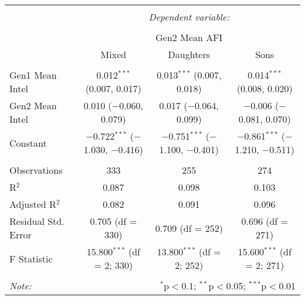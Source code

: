 
\begingroup 
\small 
\begin{tabular}{@{\extracolsep{1pt}}lccc} 
\\[-1.8ex]\hline 
\hline \\[-1.8ex] 
 & \multicolumn{3}{c}{\textit{Dependent variable:}} \\ 
\cline{2-4} 
\\[-1.8ex] & \multicolumn{3}{c}{Gen2 Mean AFI} \\ 
 & Mixed & Daughters & Sons \\ 
\hline \\[-1.8ex] 
 Gen1 Mean Intel & 0.012$^{***}$ (0.007, 0.017) & 0.013$^{***}$ (0.007, 0.018) & 0.014$^{***}$ (0.008, 0.020) \\ 
  Gen2 Mean Intel & 0.010 ($-$0.060, 0.079) & 0.017 ($-$0.064, 0.099) & $-$0.006 ($-$0.081, 0.070) \\ 
  Constant & $-$0.722$^{***}$ ($-$1.030, $-$0.416) & $-$0.751$^{***}$ ($-$1.100, $-$0.401) & $-$0.861$^{***}$ ($-$1.210, $-$0.511) \\ 
 \hline \\[-1.8ex] 
Observations & 333 & 255 & 274 \\ 
R$^{2}$ & 0.087 & 0.098 & 0.103 \\ 
Adjusted R$^{2}$ & 0.082 & 0.091 & 0.096 \\ 
Residual Std. Error & 0.705 (df = 330) & 0.709 (df = 252) & 0.696 (df = 271) \\ 
F Statistic & 15.800$^{***}$ (df = 2; 330) & 13.800$^{***}$ (df = 2; 252) & 15.600$^{***}$ (df = 2; 271) \\ 
\hline 
\hline \\[-1.8ex] 
\textit{Note:}  & \multicolumn{3}{r}{$^{*}$p$<$0.1; $^{**}$p$<$0.05; $^{***}$p$<$0.01} \\ 
\end{tabular} 
\endgroup 
